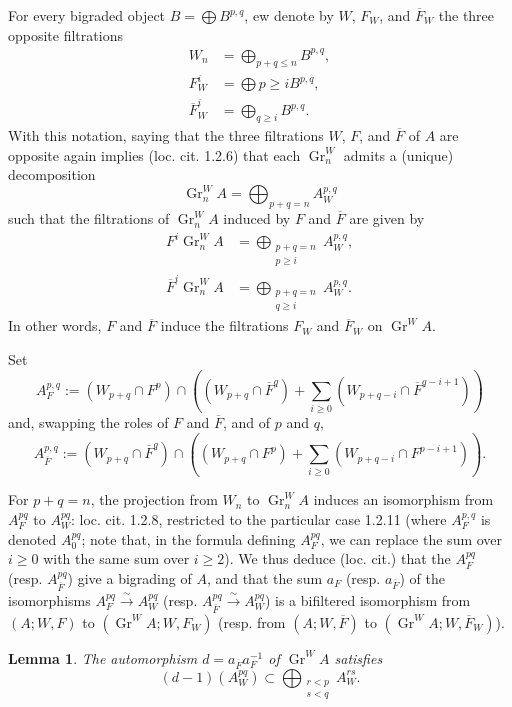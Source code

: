 \documentclass{article}
\theoremstyle{plain}
\newtheorem*{lemma*}{Lemma}
\renewcommand{\geq}{\geqslant}
\renewcommand{\leq}{\leqslant}
\DeclareMathOperator{\Gr}{Gr}
\newcommand{\oldpage}[1]{\marginpar{\footnotesize$\Big\vert$ \textit{p.~#1}}}
\begin{document}
For every bigraded object $B=\bigoplus B^{p,q}$, ew denote by $W$, $F_W$, and $\overline{F}_W$ the three opposite filtrations
\[
  \begin{aligned}
    W_n &= \bigoplus_{p+q\leq n} B^{p,q},
  \\F_W^i &= \bigoplus{p\geq i} B^{p,q},
  \\\overline{F}_W^i &= \bigoplus_{q\geq i} B^{p,q}.
  \end{aligned}
\]
With this notation, saying that the three filtrations $W$, $F$, and $\overline{F}$ of $A$ are opposite again implies (loc. cit. 1.2.6) that each $\Gr_n^W$ admits a (unique)
\oldpage{510}
decomposition
\[
  \Gr_n^W A = \bigoplus_{p+q=n} A_W^{p,q}
\]
such that the filtrations of $\Gr_n^W A$ induced by $F$ and $\overline{F}$ are given by
\[
  \begin{aligned}
    F^i\Gr_n^W A &= \bigoplus_{\substack{p+q=n\\p\geq i}} A_W^{p,q},
  \\\overline{F}^i\Gr_n^W A &= \bigoplus_{\substack{p+q=n\\q\geq i}} A_W^{p,q}.
  \end{aligned}
\]
In other words, $F$ and $\overline{F}$ induce the filtrations $F_W$ and $\overline{F}_W$ on $\Gr^W A$.

Set
\[
  A_F^{p,q} := (W_{p+q}\cap F^p) \cap \left((W_{p+q}\cap\overline{F}^q) + \sum_{i\geq0}(W_{p+q-i}\cap\overline{F}^{q-i+1})\right)
\]
and, swapping the roles of $F$ and $\overline{F}$, and of $p$ and $q$,
\[
  A_{\overline{F}}^{p,q} := (W_{p+q}\cap \overline{F}^q) \cap \left((W_{p+q}\cap F^p) + \sum_{i\geq0}(W_{p+q-i}\cap F^{p-i+1})\right).
\]

For $p+q=n$, the projection from $W_n$ to $\Gr_n^W A$ induces an isomorphism from $A_F^{pq}$ to $A_W^{pq}$: loc. cit. 1.2.8, restricted to the particular case 1.2.11 (where $A_F^{p,q}$ is denoted $A_0^{pq}$; note that, in the formula defining $A_F^{pq}$, we can replace the sum over $i\geq0$ with the same sum over $i\geq2$).
We thus deduce (loc. cit.) that the $A_F^{pq}$ (resp. $A_{\overline{F}}^{pq}$) give a bigrading of $A$, and that the sum $a_F$ (resp. $a_{\overline{F}}$) of the isomorphisms $A_F^{pq}\xrightarrow{\sim}A_W^{pq}$ (resp. $A_{\overline{F}}^{pq}\xrightarrow{\sim}A_W^{pq}$) is a bifiltered isomorphism from $(A;W,F)$ to $(\Gr^W A;W,F_W)$ (resp. from $(A;W,\overline{F})$ to $(\Gr^W A;W,\overline{F}_W)$).

\begin{lemma*}
  The automorphism $d=a_{\overline{F}}a_F^{-1}$ of $\Gr^W A$ satisfies
  \[
  \label{1.1.1}
    (d-1)(A_W^{pq}) \subset \bigoplus_{\substack{r<p\\s<q}} A_W^{rs}.
  \tag{1.1.1}
  \]
\end{lemma*}
\end{document}
